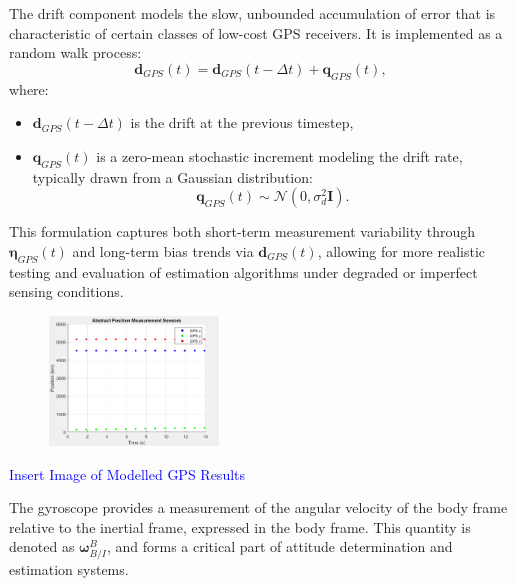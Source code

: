The drift component models the slow, unbounded accumulation of error that is characteristic of certain classes of low-cost GPS receivers. It is implemented as a random walk process:
\begin{equation}
    \mathbf{d}_{GPS}(t) = \mathbf{d}_{GPS}(t - \Delta t) + \mathbf{q}_{GPS}(t),
\end{equation}
where:
\begin{itemize}
    \item $\mathbf{d}_{GPS}(t - \Delta t)$ is the drift at the previous timestep,
    \item $\mathbf{q}_{GPS}(t)$ is a zero-mean stochastic increment modeling the drift rate, typically drawn from a Gaussian distribution:
    \begin{equation}
        \mathbf{q}_{GPS}(t) \sim \mathcal{N}(0, \sigma_d^2 \mathbf{I}).
    \end{equation}
\end{itemize}

This formulation captures both short-term measurement variability through $\boldsymbol{\eta}_{GPS}(t)$ and long-term bias trends via $\mathbf{d}_{GPS}(t)$, allowing for more realistic testing and evaluation of estimation algorithms under degraded or imperfect sensing conditions.


\begin{figure}[H]
    \centering
    \includegraphics[width=0.4\textwidth]{figures/modelling/GPSMeasurement.png}
    \caption{}
    \label{fig:MRF}
\end{figure}



\textcolor{blue}{Insert Image of Modelled GPS Results}


The gyroscope provides a measurement of the angular velocity of the body frame relative to the inertial frame, expressed in the body frame. This quantity is denoted as $\boldsymbol{\omega}^B_{B/I}$, and forms a critical part of attitude determination and estimation systems.


